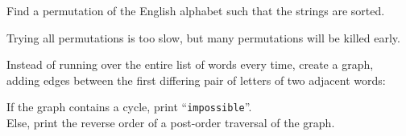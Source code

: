 \begin{frame}
    \frametitle{\problemtitle}
    \begin{description}
        \item<+->[Problem:] Find a permutation of the English alphabet such that the strings are sorted.
        \item<+->[Observation:] Trying all permutations is too slow, but many permutations will be killed early.
        \item<+->[Preparation:] Instead of running over the entire list of words every time, create a graph, \\
            adding edges between the first differing pair of letters of two adjacent words:
    \end{description}
    \begin{description}
        \item<6->[Solution:] If the graph contains a cycle, print ``\texttt{impossible}''. \\
            Else, print the reverse order of a post-order traversal of the graph.
    \end{description}
    \solvestats
\end{frame}
